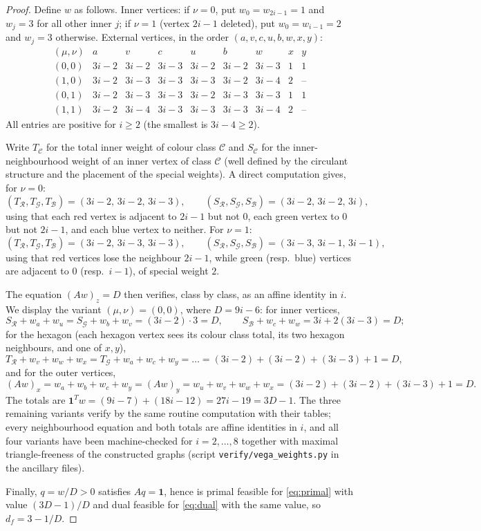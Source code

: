 \documentclass[11pt]{article}
\theoremstyle{definition}
\theoremstyle{remark}
\newcommand{\df}{d_f}
\newcommand{\ones}{\mathbf 1}
\newcommand{\R}{\mathcal R}
\newcommand{\G}{\mathcal G}
\newcommand{\B}{\mathcal B}
\begin{document}
\begin{proof}
Define $w$ as follows. Inner vertices: if $\nu=0$, put $w_0=w_{2i-1}=1$ and $w_j=3$ for all
other inner $j$; if $\nu=1$ (vertex $2i-1$ deleted), put $w_0=w_{i-1}=2$ and $w_j=3$
otherwise. External vertices, in the order $(a,v,c,u,b,w,x,y)$:
\[
\begin{array}{c|cccccccc}
(\mu,\nu) & a & v & c & u & b & w & x & y\\\hline
(0,0) & 3i{-}2 & 3i{-}2 & 3i{-}3 & 3i{-}2 & 3i{-}2 & 3i{-}3 & 1 & 1\\
(1,0) & 3i{-}2 & 3i{-}3 & 3i{-}3 & 3i{-}3 & 3i{-}2 & 3i{-}4 & 2 & \text{--}\\
(0,1) & 3i{-}2 & 3i{-}3 & 3i{-}3 & 3i{-}2 & 3i{-}3 & 3i{-}3 & 1 & 1\\
(1,1) & 3i{-}2 & 3i{-}4 & 3i{-}3 & 3i{-}3 & 3i{-}3 & 3i{-}4 & 2 & \text{--}
\end{array}
\]
All entries are positive for $i\ge2$ (the smallest is $3i-4\ge2$).

Write $T_\mathcal{C}$ for the total inner weight of colour class $\mathcal C$ and
$S_\mathcal{C}$ for the inner-neighbourhood weight of an inner vertex of class $\mathcal C$
(well defined by the circulant structure and the placement of the special weights). A direct
computation gives, for $\nu=0$:
\[
(T_\R,T_\G,T_\B)=(3i{-}2,\,3i{-}2,\,3i{-}3),\qquad
(S_\R,S_\G,S_\B)=(3i{-}2,\,3i{-}2,\,3i),
\]
using that each red vertex is adjacent to $2i-1$ but not $0$, each green vertex to $0$ but
not $2i-1$, and each blue vertex to neither. For $\nu=1$:
\[
(T_\R,T_\G,T_\B)=(3i{-}2,\,3i{-}3,\,3i{-}3),\qquad
(S_\R,S_\G,S_\B)=(3i{-}3,\,3i{-}1,\,3i{-}1),
\]
using that red vertices lose the neighbour $2i-1$, while green (resp.\ blue) vertices are
adjacent to $0$ (resp.\ $i-1$), of special weight $2$.

The equation $(Aw)_z=D$ then verifies, class by class, as an affine identity in $i$. We
display the variant $(\mu,\nu)=(0,0)$, where $D=9i-6$: for inner vertices,
\[
S_\R+w_a+w_u=S_\G+w_b+w_v=(3i{-}2)\cdot3=D,\qquad
S_\B+w_c+w_w=3i+2(3i{-}3)=D;
\]
for the hexagon (each hexagon vertex sees its colour class total, its two hexagon
neighbours, and one of $x,y$),
\[
T_\R+w_v+w_w+w_x
=T_\G+w_a+w_c+w_y
=\dots
=(3i{-}2)+(3i{-}2)+(3i{-}3)+1=D,
\]
and for the outer vertices,
\[
(Aw)_x=w_a+w_b+w_c+w_y=(Aw)_y=w_u+w_v+w_w+w_x=(3i{-}2)+(3i{-}2)+(3i{-}3)+1=D .
\]
The totals are $\ones^Tw=(9i-7)+(18i-12)=27i-19=3D-1$. The three remaining variants verify
by the same routine computation with their tables; every neighbourhood equation and both
totals are affine identities in $i$, and all four variants have been machine-checked for
$i=2,\dots,8$ together with maximal triangle-freeness of the constructed graphs (script
\texttt{verify/vega\_weights.py} in the ancillary files).

Finally, $q=w/D>0$ satisfies $Aq=\ones$, hence is primal feasible for \eqref{eq:primal} with
value $(3D-1)/D$ and dual feasible for \eqref{eq:dual} with the same value, so
$\df=3-1/D$.
\end{proof}
\end{document}
